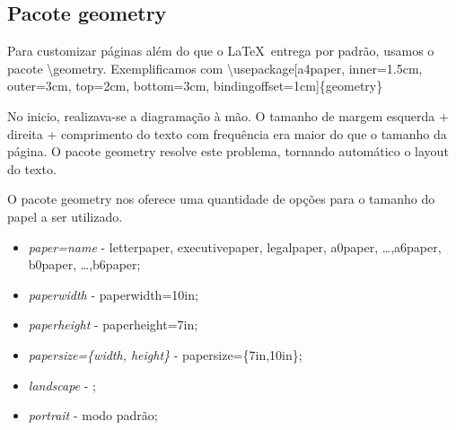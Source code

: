 \begin{landscape}
\section{Pacote geometry}
Para customizar páginas além do que o \LaTeX\ entrega por padrão, usamos o pacote \textbackslash geometry. 
Exemplificamos com 
\textbackslash usepackage[a4paper, inner=1.5cm, outer=3cm, top=2cm, bottom=3cm, bindingoffset=1cm]\{geometry\}

No inicio, realizava-se a diagramação à mão.
O tamanho de margem esquerda + direita + comprimento do texto com frequência era maior do que o tamanho da página.
O pacote geometry resolve este problema, tornando automático o layout do texto.

O pacote geometry nos oferece uma quantidade de opções para o tamanho do papel a ser utilizado.

\begin{multicols}{2}
\begin{itemize}
    \item \emph{paper=name} - letterpaper, executivepaper, legalpaper, a0paper, \ldots ,a6paper, b0paper, \ldots ,b6paper;
    \item \emph{paperwidth} - paperwidth=10in;
    \item \emph{paperheight} - paperheight=7in;
    \item \emph{papersize=\{width, height\}} - papersize=\{7in,10in\};
    \item \emph{landscape} - ;
    \item \emph{portrait} - modo padrão;
\end{itemize}
\end{multicols}


\end{landscape}
